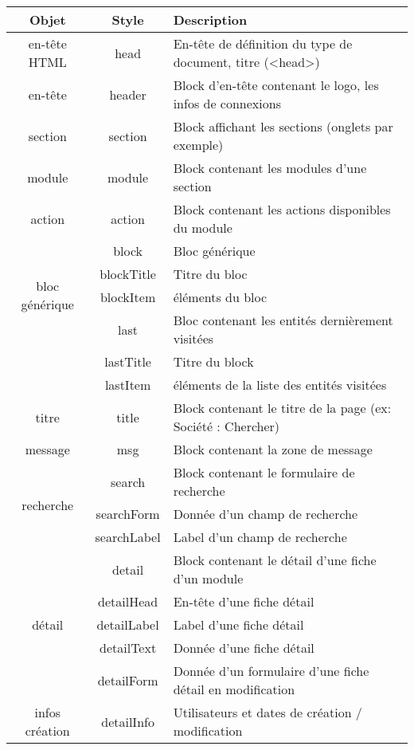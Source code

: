 \begin{tabular}{|c|c|p{8.8cm}|}
\hline
\textbf{Objet} & \textbf{Style} & \textbf{Description}\\
\hline
en-tête HTML & head & En-tête de définition du type de document, titre (<head>)\\
\hline
en-tête & header & Block d'en-tête contenant le logo, les infos de connexions\\
\hline
section & section & Block affichant les sections (onglets par exemple)\\
\hline
module & module & Block contenant les modules d'une section\\
\hline
action & action & Block contenant les actions disponibles du module\\
\hline
\multirow{4}{3cm}{bloc générique} & block & Bloc générique\\
\cline{2-3}
 & blockTitle & Titre du bloc \\
\cline{2-3}
 & blockItem & éléments du bloc \\
\hline
\multirow{4}{3cm}{dernière visite} & last & Bloc contenant les entités dernièrement visitées\\
\cline{2-3}
 & lastTitle & Titre du block \\
\cline{2-3}
 & lastItem & éléments de la liste des entités visitées \\
\hline
titre & title & Block contenant le titre de la page (ex: Société : Chercher)\\
\hline
message & msg & Block contenant la zone de message\\
\hline
\multirow{3}{3cm}{recherche} & search & Block contenant le formulaire de recherche\\
\cline{2-3}
 & searchForm & Donnée d'un champ de recherche \\
\cline{2-3}
 & searchLabel & Label d'un champ de recherche \\
\hline
\multirow{5}{3cm}{détail} & detail & Block contenant le détail d'une fiche d'un module\\
\cline{2-3}
 & detailHead & En-tête d'une fiche détail \\
\cline{2-3}
 & detailLabel & Label d'une fiche détail \\
\cline{2-3}
 & detailText & Donnée d'une fiche détail \\
\cline{2-3}
 & detailForm & Donnée d'un formulaire d'une fiche détail en modification \\
\hline
infos création & detailInfo & Utilisateurs et dates de création / modification\\

\end{tabular}

